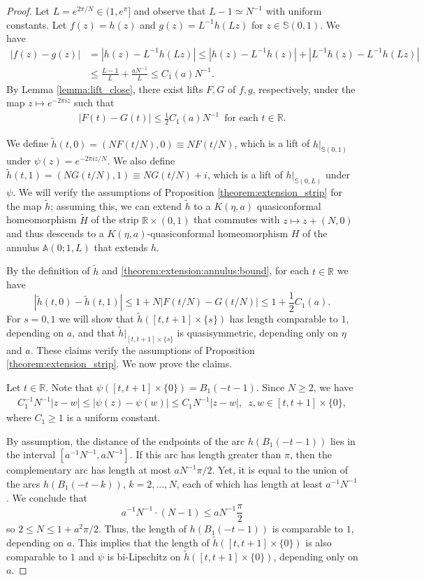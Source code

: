 \documentclass[letterpaper]{amsart}
\theoremstyle{plain}
\theoremstyle{definition}
\theoremstyle{remark}
\numberwithin{equation}{section}
\numberwithin{theorem}{section}
\newcommand{\R}{\mathbb R}
\begin{document}
\begin{proof}
Let $L=e^{2\pi/N} \in (1,e^\pi]$ and observe that $L-1\simeq N^{-1}$ with uniform constants. Let $f(z)=h(z)$ and $g(z)=L^{-1}h(Lz)$ for $z\in \mathbb S(0,1)$. We have
\begin{align*}
|f(z)-g(z)|&= |h(z)- L^{-1} h(Lz)|\leq |h(z)- L^{-1}h(z)|+|L^{-1}h(z)- L^{-1} h(Lz)|\\
&\leq \frac{L-1}{L}+\frac{aN^{-1}}{L}\leq C_1(a)N^{-1}. 
\end{align*}
By Lemma \ref{lemma:lift_close}, there exist lifts $F,G$ of $f,g$, respectively, under the map $z\mapsto e^{-2\pi i z}$ such that 
\begin{align}\label{theorem:extension:annulus:bound}
|F(t)-G(t)|\leq \frac{1}{2}C_1(a)N^{-1}\,\,\, \text{for each $t\in \R$.}
\end{align}

We define $\widetilde h(t,0)=(NF(t/N),0)\equiv NF(t/N)$, which is a lift of $h|_{\mathbb S(0,1)}$ under $\psi(z)=e^{-2\pi i z/N}$. We also define $\widetilde h(t,1)=(NG(t/N),1)\equiv NG(t/N)+i$, which is a lift of $h|_{\mathbb S(0,L)}$ under $\psi$. We will verify the assumptions of Proposition \ref{theorem:extension_strip} for the map $\widetilde h$; assuming this, we can extend $\widetilde h$ to a $K(\eta,a)$ quasiconformal homeomorphism $\widetilde H$ of the strip $\R\times (0,1)$ that commutes with $z\mapsto z+(N,0)$ and thus descends to a $K(\eta,a)$-quasiconformal homeomorphism $H$ of the annulus $\mathbb A(0;1,L)$ that extends $h$.

By the definition of $\widetilde h$ and \eqref{theorem:extension:annulus:bound}, for each $t\in \R$ we have 
$$|\widetilde h(t,0)- \widetilde h(t,1)|\leq 1+ N|F(t/N)-G(t/N)|\leq 1+ \frac{1}{2}C_1(a).$$
For $s=0,1$ we will show that $\widetilde h([t,t+1]\times \{s\})$ has length comparable to $1$, depending on $a$, and that $\widetilde h|_{[t,t+1]\times \{s\}}$ is quasisymmetric, depending only on $\eta$ and $a$. These claims verify the assumptions of Proposition \ref{theorem:extension_strip}. We now prove the claims. 

Let $t\in \R$. Note that $\psi([t,t+1]\times \{0\})=B_1(-t-1)$. Since $N\geq 2$, we have
\begin{align}\label{theorem:extension_annulus:ineq:1}
C_1^{-1}N^{-1}|z-w|\leq |\psi(z)-\psi(w)|\leq C_1 N^{-1}|z-w|,\,\,\, z,w \in [t,t+1]\times \{0\},
\end{align}
where $C_1\geq 1$ is a uniform constant. 

By assumption, the distance of the endpoints of the arc $h(B_1(-t-1))$ lies in the interval $[a^{-1}N^{-1},aN^{-1}]$. If this arc has length greater than $\pi$, then the complementary arc has length at most $aN^{-1}\pi/2$. Yet, it is equal to the union of the arcs $h(B_1(-t-k))$, $k=2,\dots,N$, each of which has length at least $a^{-1}N^{-1}$. We conclude that
$$a^{-1}N^{-1}\cdot (N-1) \leq aN^{-1} \frac{\pi}{2}$$
so $2\leq N\leq 1+a^2\pi/2$. Thus, the length of $h(B_1(-t-1))$ is comparable to $1$, depending on $a$. This implies that the length of $\widetilde h([t,t+1]\times \{0\})$ is also comparable to $1$ and $\psi$ is bi-Lipschitz on $\widetilde h([t,t+1]\times \{0\})$, depending only on $a$. 


\end{proof}
\end{document}
